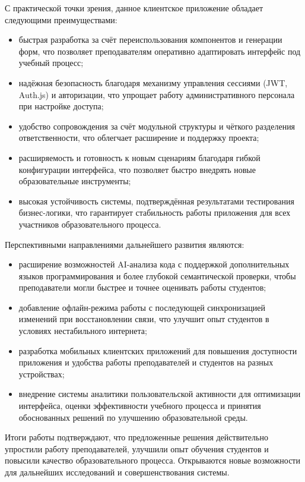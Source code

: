 С практической точки зрения, данное клиентское приложение обладает следующими преимуществами:
\begin{itemize}
  \item быстрая разработка за счёт переиспользования компонентов и генерации форм, что позволяет преподавателям оперативно адаптировать интерфейс под учебный процесс;
  \item надёжная безопасность благодаря механизму управления сессиями (JWT, Auth.js) и авторизации, что упрощает работу административного персонала при настройке доступа;
  \item удобство сопровождения за счёт модульной структуры и чёткого разделения ответственности, что облегчает расширение и поддержку проекта;
  \item расширяемость и готовность к новым сценариям благодаря гибкой конфигурации интерфейса, что позволяет быстро внедрять новые образовательные инструменты;
  \item высокая устойчивость системы, подтверждённая результатами тестирования бизнес-логики, что гарантирует стабильность работы приложения для всех участников образовательного процесса.
\end{itemize}

Перспективными направлениями дальнейшего развития являются:
\begin{itemize}
  \item расширение возможностей AI-анализа кода с поддержкой дополнительных языков программирования и более глубокой семантической проверки, чтобы преподаватели могли быстрее и точнее оценивать работы студентов;
  \item добавление офлайн-режима работы с последующей синхронизацией изменений при восстановлении связи, что улучшит опыт студентов в условиях нестабильного интернета;
  \item разработка мобильных клиентских приложений для повышения доступности приложения и удобства работы преподавателей и студентов на разных устройствах;
  \item внедрение системы аналитики пользовательской активности для оптимизации интерфейса, оценки эффективности учебного процесса и принятия обоснованных решений по улучшению образовательной среды.
\end{itemize}

Итоги работы подтверждают, что предложенные решения действительно упростили работу преподавателей, улучшили опыт обучения студентов и повысили качество образовательного процесса. Открываются новые возможности для дальнейших исследований и совершенствования системы.
